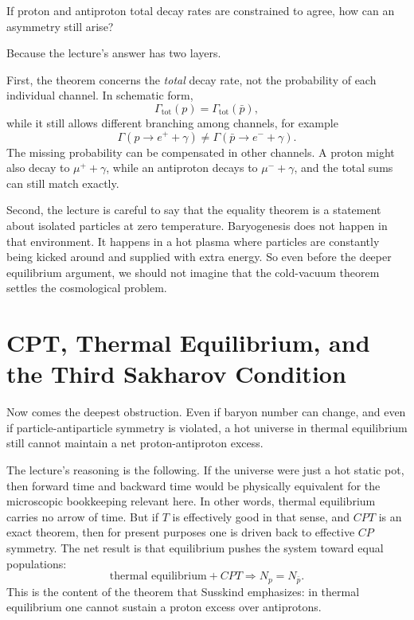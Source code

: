 If proton and antiproton total decay rates are constrained to agree, how can an asymmetry still arise?

Because the lecture's answer has two layers.

First, the theorem concerns the \emph{total} decay rate, not the probability of each individual channel. In schematic form,
\begin{equation}
\Gamma_{\mathrm{tot}}(p)=\Gamma_{\mathrm{tot}}(\bar p),
\end{equation}
while it still allows different branching among channels, for example
\begin{equation}
\Gamma(p\to e^+ + \gamma)\neq \Gamma(\bar p\to e^- + \gamma).
\end{equation}
The missing probability can be compensated in other channels. A proton might also decay to \(\mu^+ + \gamma\), while an antiproton decays to \(\mu^- + \gamma\), and the total sums can still match exactly.

Second, the lecture is careful to say that the equality theorem is a statement about isolated particles at zero temperature. Baryogenesis does not happen in that environment. It happens in a hot plasma where particles are constantly being kicked around and supplied with extra energy. So even before the deeper equilibrium argument, we should not imagine that the cold-vacuum theorem settles the cosmological problem.

\section{CPT, Thermal Equilibrium, and the Third Sakharov Condition}

Now comes the deepest obstruction. Even if baryon number can change, and even if particle-antiparticle symmetry is violated, a hot universe in thermal equilibrium still cannot maintain a net proton-antiproton excess.

The lecture's reasoning is the following. If the universe were just a hot static pot, then forward time and backward time would be physically equivalent for the microscopic bookkeeping relevant here. In other words, thermal equilibrium carries no arrow of time. But if \(T\) is effectively good in that sense, and \(CPT\) is an exact theorem, then for present purposes one is driven back to effective \(CP\) symmetry. The net result is that equilibrium pushes the system toward equal populations:
\begin{equation}
\text{thermal equilibrium} + CPT \Longrightarrow N_p=N_{\bar p}.
\end{equation}
This is the content of the theorem that Susskind emphasizes: in thermal equilibrium one cannot sustain a proton excess over antiprotons.

